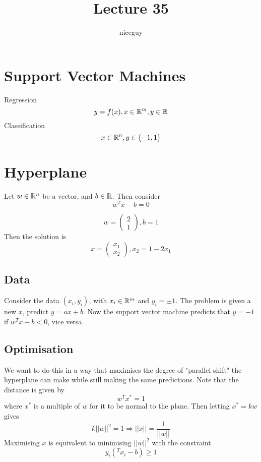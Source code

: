 \documentclass[12pt]{article}
\author{niceguy}
\title{Lecture 35}
\begin{document}
\maketitle

\section{Support Vector Machines}

Regression
$$y=f(x), x \in \mathbb{R}^m, y \in \mathbb{R}$$
Classification
$$x \in \mathbb{R}^n, y \in \{-1,1\}$$

\section{Hyperplane}

Let $w\in\mathbb{R}^n$ be a vector, and $b \in \mathbb{R}$. Then consider
$$w^Tx-b = 0$$

\begin{ex}
    $$w = \begin{pmatrix} 2 \\ 1 \end{pmatrix}, b = 1$$
    Then the solution is
    $$x = \begin{pmatrix} x_1 \\ x_2\end{pmatrix}, x_2 = 1-2x_1$$
\end{ex}

\subsection{Data}

Consider the data $(x_i,y_i)$, with $x_i \in \mathbb{R}^m$ and $y_i = \pm 1$. The problem is given a new $x$, predict $y=ax+b$. Now the support vector machine predicts that $y=-1$ if $w^Tx-b<0$, vice versa.

\subsection{Optimisation}

We want to do this in a way that maximises the degree of "parallel shift" the hyperplane can make while still making the same predictions. Note that the distance is given by
$$w^Tx^* = 1$$
where $x^*$ is a multiple of $w$ for it to be normal to the plane. Then letting $x^* = kw$ gives
$$k||w||^2 = 1 \Rightarrow ||x|| = \frac{1}{||w||}$$
Maximising $x$ is equivalent to minimising $||w||^2$ with the constraint
$$y_i(^Tx_i - b) \geq 1$$
\end{document}

